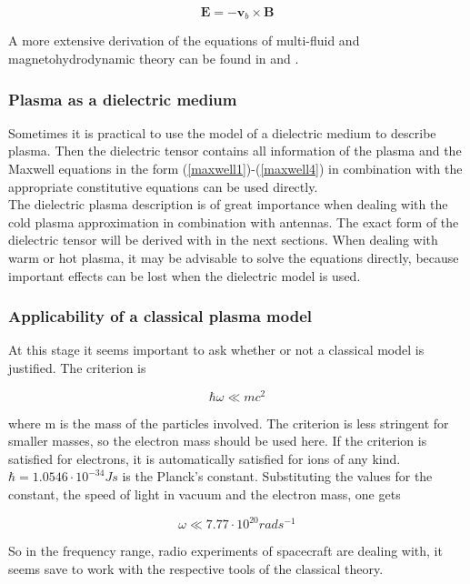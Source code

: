 \documentclass[a4paper,11pt]{thesis}
\begin{document}
\begin{equation}
     \mathbf{E} = -\mathbf{v}_b \times \mathbf{B}
\end{equation}

A more extensive derivation of the equations of multi-fluid and
magnetohydrodynamic theory can be found in \cite{baumjohann1} and
\cite{bellan}.

\subsubsection{Plasma as a dielectric medium}
Sometimes it is practical to use the model of a dielectric medium to
describe plasma. Then the dielectric tensor contains all information
of the plasma and the Maxwell equations in the form
(\ref{maxwell1})-(\ref{maxwell4}) in combination with the
appropriate constitutive equations can be used directly.\\

The dielectric plasma description is of great importance when
dealing with the cold plasma approximation in combination with antennas. The exact form of the dielectric tensor
will be derived with in the next sections. When dealing with warm or hot plasma, it may be advisable to solve the equations directly, because important effects can be lost when the dielectric model is used.

\subsubsection{Applicability of a classical plasma model}
At this stage it seems important to ask whether or not a classical model is justified. The criterion is

\begin{equation}
    \hbar \omega \ll m c^2
\end{equation}

where m is the mass of the particles involved. The criterion is less stringent for smaller masses, so the electron mass should be used here. If the criterion is satisfied for electrons, it is automatically satisfied for ions of any kind. $\hbar=1.0546 \cdot 10^{-34} Js $ is the Planck's constant. Substituting the values for the constant, the speed of light in vacuum and the electron mass, one gets

\begin{equation}
    \omega \ll 7.77 \cdot 10^{20} rad s^{-1}
\end{equation}

So in the frequency range, radio experiments of spacecraft are dealing with, it seems save to work with the respective tools of the classical theory.
\end{document}
